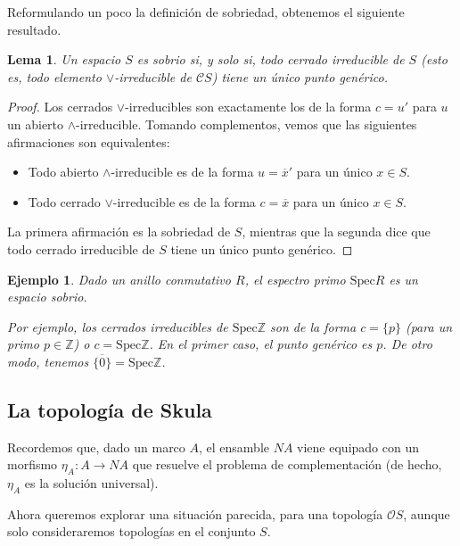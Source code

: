 \documentclass[12pt,letterpaper,titlepage]{article}
\newtheorem*{exa}{Ejemplo}
\newtheorem{lemma}{Lema}
\theoremstyle{definition}
\renewcommand\sup{\vee}
\newcommand\ol[1]{\overline{#1}}
\renewcommand\inf{\wedge}
\newcommand\Z{\mathbb Z}
\renewcommand\cal[1]{\mathcal{#1}}
\newcommand\<{\langle}
\renewcommand\>{\rangle}
\begin{document}
Reformulando un poco la definición de sobriedad,
obtenemos el siguiente resultado.
\begin{lemma}
    Un espacio $S$ es sobrio si, y solo si,
    todo cerrado irreducible de $S$
    (esto es, todo elemento $\sup$-irreducible de $\cal CS$)
    tiene un único punto genérico.
\end{lemma}
\begin{proof}
    Los cerrados $\sup$-irreducibles son exactamente
    los de la forma $c=u'$ para $u$ un abierto $\inf$-irreducible.
    Tomando complementos, vemos que las siguientes afirmaciones
    son equivalentes:
    \begin{itemize}
         \item Todo abierto $\inf$-irreducible es de
         la forma $u=\ol{x}'$ para un único $x\in S$.
         \item Todo cerrado $\sup$-irreducible es de
         la forma $c=\ol x$ para un único $x\in S$.
    \end{itemize}
    La primera afirmación es la sobriedad de $S$,
    mientras que la segunda dice que todo cerrado
    irreducible de $S$ tiene un único punto genérico.
\end{proof}

\begin{exa}
    Dado un anillo conmutativo $R$,
    el espectro primo $\mathrm{Spec}R$ es un espacio sobrio.
    
    Por ejemplo, los cerrados irreducibles de $\mathrm{Spec}\Z$ son
    de la forma $c=\{p\}$ (para un primo $p\in\Z$) o $c=\mathrm{Spec}\Z$.
    En el primer caso, el punto genérico es $p$.
    De otro modo, tenemos $\ol{\{0\}}=\mathrm{Spec}\Z$.
\end{exa}


\subsection{La topología de Skula}

Recordemos que, dado un marco $A$, el ensamble $NA$ viene equipado con
un morfismo $\eta_A:A\to NA$ que resuelve el problema de complementación
(de hecho, $\eta_A$ es la solución universal).

Ahora queremos explorar una situación parecida, para una topología
$\cal OS$, aunque solo consideraremos topologías en el conjunto $S$.
\end{document}
